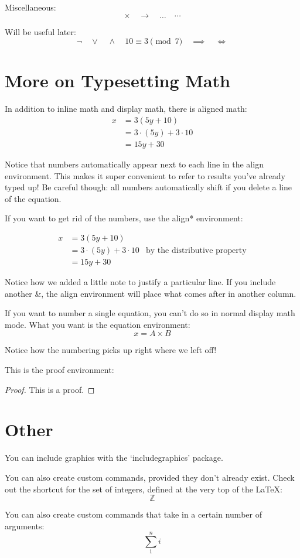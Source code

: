 \documentclass[12pt,letterpaper]{article}
\newcommand\Z{\mathbb{Z}}
\newcommand\sumover[2]{\sum_{#1}^{#2}}
\begin{document}
Miscellaneous:
\[
\times \quad \rightarrow \quad \ldots \quad \cdots
\]

Will be useful later:
\[
\neg \quad \vee \quad \wedge \quad 10 \equiv 3 \pmod{7}
\quad \implies \quad \iff
\]

\section{More on Typesetting Math}
In addition to inline math and display math,
there is aligned math:
\begin{align}
x &= 3 (5 y + 10) \\
  &= 3 \cdot (5 y) + 3 \cdot 10 \\
  &= 15y + 30
\end{align}

Notice that numbers automatically appear next to each line
in the align environment. This makes it super
convenient to refer to results you've already
typed up! Be careful though: all numbers
automatically shift if you delete a line of the equation.

If you want to get rid of the numbers, use the
align* environment:

\begin{align*}
x &= 3 (5 y + 10) \\
  &= 3 \cdot (5 y) + 3 \cdot 10 & \text{by the distributive property}\\
  &= 15y + 30
\end{align*}

Notice how we added a little note to justify a particular line.
If you include another \&, the align environment will place
what comes after in another column.

If you want to number a single equation, you can't do so in
normal display math mode. What you want is the equation
environment:
\begin{equation}
x = A \times B
\end{equation}

Notice how the numbering picks up right where we left off!

This is the proof environment:
\begin{proof}
This is a proof.
\end{proof}

\section{Other}

You can include graphics with the `includegraphics' package.

You can also create custom commands, provided they don't already exist.
Check out the shortcut for the set of integers, defined at the very top
of the LaTeX:
\[
\Z
\]

You can also create custom commands that take in a certain number of
arguments:
\[
\sumover{1}{n}i
\]
\end{document}
